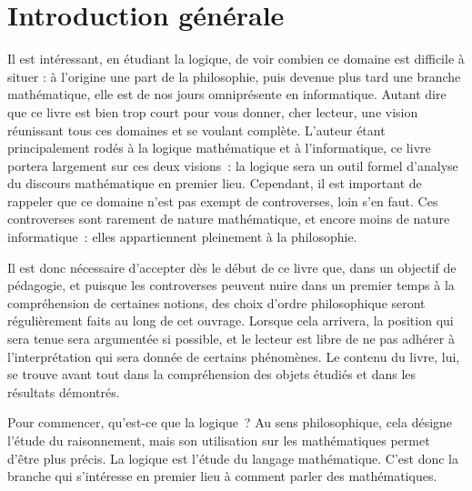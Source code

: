 \chapter[Introduction générale]{Introduction générale}

Il est intéressant, en étudiant la logique, de voir combien ce domaine est
difficile à situer : à l'origine une part de la philosophie, puis devenue plus
tard une branche mathématique, elle est de nos jours omniprésente en
informatique. Autant dire que ce livre est bien trop court pour vous donner,
cher lecteur, une vision réunissant tous ces domaines et se voulant complète.
L'auteur étant principalement rodés à la logique mathématique et à
l'informatique, ce livre portera largement sur ces deux visions~: la logique
sera un outil formel d'analyse du discours mathématique en premier lieu.
Cependant, il est important de rappeler que ce domaine n'est pas exempt de
controverses, loin s'en faut. Ces controverses sont rarement de nature
mathématique, et encore moins de nature informatique~: elles appartiennent
pleinement à la philosophie.

Il est donc nécessaire d'accepter dès le début de ce livre que, dans un objectif
de pédagogie, et puisque les controverses peuvent nuire dans un premier temps à
la compréhension de certaines notions, des choix d'ordre philosophique seront
régulièrement faits au long de cet ouvrage. Lorsque cela arrivera, la position
qui sera tenue sera argumentée si possible, et le lecteur est libre de ne pas
adhérer à l'interprétation qui sera donnée de certains phénomènes. Le contenu du
livre, lui, se trouve avant tout dans la compréhension des objets étudiés et
dans les résultats démontrés.

Pour commencer, qu'est-ce que la logique~? Au sens philosophique, cela désigne
l'étude du raisonnement, mais son utilisation sur les mathématiques permet
d'être plus précis. La logique est l'étude du langage mathématique. C'est donc
la branche qui s'intéresse en premier lieu à comment parler des mathématiques.

